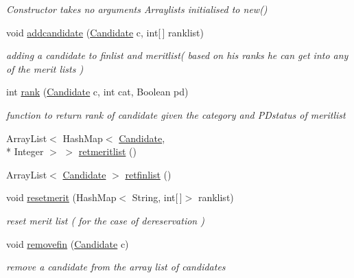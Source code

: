 \begin{DoxyCompactItemize}
\begin{DoxyCompactList}\small\item\em Constructor takes no arguments Arraylists initialised to new() \end{DoxyCompactList}\item 
void \hyperlink{classalgo1_1_1MeritList_a7181fdbcb8d0f1893a26009128845b4d}{addcandidate} (\hyperlink{classalgo1_1_1Candidate}{Candidate} c, int\mbox{[}$\,$\mbox{]} ranklist)
\begin{DoxyCompactList}\small\item\em adding a candidate to finlist and meritlist( based on his ranks he can get into any of the merit lists ) \end{DoxyCompactList}\item 
int \hyperlink{classalgo1_1_1MeritList_a6435cf09817f3bf29fbee5a2e6fe0c6f}{rank} (\hyperlink{classalgo1_1_1Candidate}{Candidate} c, int cat, Boolean pd)
\begin{DoxyCompactList}\small\item\em function to return rank of candidate given the category and P\+Dstatus of meritlist \end{DoxyCompactList}\item 
Array\+List$<$ Hash\+Map$<$ \hyperlink{classalgo1_1_1Candidate}{Candidate}, \\*
Integer $>$ $>$ \hyperlink{classalgo1_1_1MeritList_a4b2b79f9fd96e71ba58b1bdb68a0e547}{retmeritlist} ()
\item 
Array\+List$<$ \hyperlink{classalgo1_1_1Candidate}{Candidate} $>$ \hyperlink{classalgo1_1_1MeritList_af73c2b6eecff565900e1eb5416446664}{retfinlist} ()
\item 
void \hyperlink{classalgo1_1_1MeritList_a39d0fd32a27e81f645b5ace596a6adb6}{resetmerit} (Hash\+Map$<$ String, int\mbox{[}$\,$\mbox{]}$>$ ranklist)
\begin{DoxyCompactList}\small\item\em reset merit list ( for the case of dereservation ) ~\newline
 \end{DoxyCompactList}\item 
void \hyperlink{classalgo1_1_1MeritList_afeb9301c32e3ae724c6bdae5f9923c39}{removefin} (\hyperlink{classalgo1_1_1Candidate}{Candidate} c)
\begin{DoxyCompactList}\small\item\em remove a candidate from the array list of candidates \end{DoxyCompactList}\end{DoxyCompactItemize}


